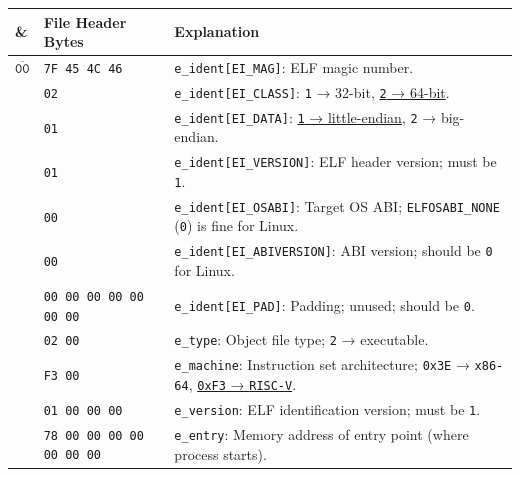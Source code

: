 \documentclass[a4paper,12pt,final]{article}
\begin{document}
\begin{table}[!htbp] \begin{adjustwidth}{-1cm}{-1cm} \fontsize{9}{10.800000}\selectfont
\begin{center}
\begin{tabular}{l|l|l}
\textbf{\&} & \textbf{File Header Bytes} & \textbf{Explanation}\\[0pt]
\hline
\(\overline{\texttt{00}}\) & \hspace{0.000000em}​\texttt{7F 45 4C 46} & \texttt{e\_ident[EI\_MAG]}: ELF magic number.\\[0pt]
 & \hspace{6.318000em}​\texttt{02} & \texttt{e\_ident[EI\_CLASS]}: \texttt{1} → 32-bit, \uline{\texttt{2} → 64-bit}.\\[0pt]
 & \hspace{7.897500em}​\texttt{01} & \texttt{e\_ident[EI\_DATA]}: \uline{\texttt{1} → little-endian}, \texttt{2} → big-endian.\\[0pt]
 & \hspace{9.477000em}​\texttt{01} & \texttt{e\_ident[EI\_VERSION]}: ELF header version; must be \texttt{1}.\\[0pt]
 & \hspace{11.056500em}​\texttt{00} & \texttt{e\_ident[EI\_OSABI]}: Target OS ABI; \texttt{ELFOSABI\_NONE} (\texttt{0}) is fine for Linux.\\[0pt]
 & \hspace{0.000000em}​\texttt{00} & \texttt{e\_ident[EI\_ABIVERSION]}: ABI version; should be \texttt{0} for Linux.\\[0pt]
 & \hspace{1.579500em}​\texttt{00 00 00 00 00 00 00} & \texttt{e\_ident[EI\_PAD]}: Padding; unused; should be \texttt{0}.\\[0pt]
\hline
 & \hspace{0.000000em}​\texttt{02 00} & \texttt{e\_type}: Object file type; \texttt{2} → executable.\\[0pt]
 & \hspace{3.159000em}​\texttt{F3 00} & \texttt{e\_machine}: Instruction set architecture; \texttt{0x3E} → \texttt{x86-64}, \uline{\texttt{0xF3} → \texttt{RISC-V}}.\\[0pt]
 & \hspace{6.318000em}​\texttt{01 00 00 00} & \texttt{e\_version}: ELF identification version; must be \texttt{1}.\\[0pt]
 & \hspace{0.000000em}​\texttt{78 00 00 00 00 00 00 00} & \texttt{e\_entry}: Memory address of entry point (where process starts).\\[0pt]

\end{tabular}
\end{center}
\end{adjustwidth}
\end{table}
\end{document}
